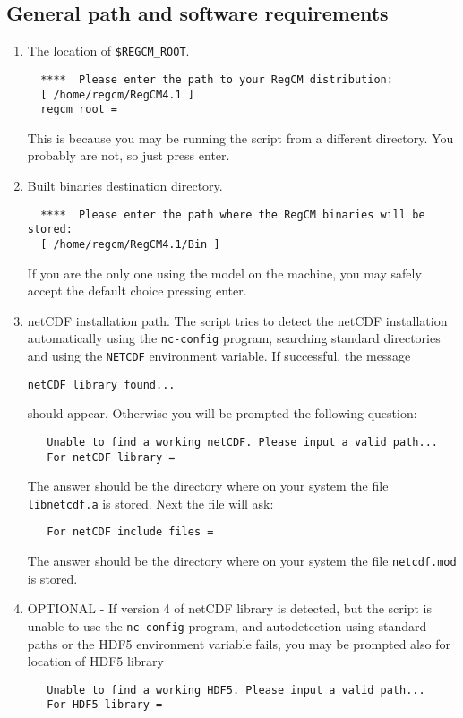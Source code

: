 \subsection{General path and software requirements}
\begin{enumerate}
\item The location of \verb=$REGCM_ROOT=.
\begin{Verbatim}
  ****  Please enter the path to your RegCM distribution: 
  [ /home/regcm/RegCM4.1 ]
  regcm_root =
\end{Verbatim}
This is because you may be running the script from a different directory.
You probably are not, so just press enter.
\item Built binaries destination directory.
\begin{Verbatim}
  ****  Please enter the path where the RegCM binaries will be stored: 
  [ /home/regcm/RegCM4.1/Bin ]
\end{Verbatim}
If you are the only one using the model on the machine, you may safely
accept the default choice pressing enter.
\item netCDF installation path. The script tries to detect the netCDF
installation automatically using the \verb=nc-config= program, searching
standard directories and using the \verb=NETCDF= environment variable.
If successful, the message
\begin{Verbatim}
netCDF library found...
\end{Verbatim}
should appear. Otherwise you will be prompted the following question:
\begin{Verbatim}
   Unable to find a working netCDF. Please input a valid path...
   For netCDF library =
\end{Verbatim}
The answer should be the directory where on your system the file
\verb=libnetcdf.a= is stored. Next the file will ask:
\begin{Verbatim}
   For netCDF include files =
\end{Verbatim}
The answer should be the directory where on your system the file
\verb=netcdf.mod= is stored.
\item OPTIONAL - If version 4 of netCDF library is detected, but the
script is unable to use the \verb=nc-config= program, and autodetection
using standard paths or the HDF5 environment variable fails, you may be
prompted also for location of HDF5 library
\begin{Verbatim}
   Unable to find a working HDF5. Please input a valid path...
   For HDF5 library =
\end{Verbatim}

\end{enumerate}
